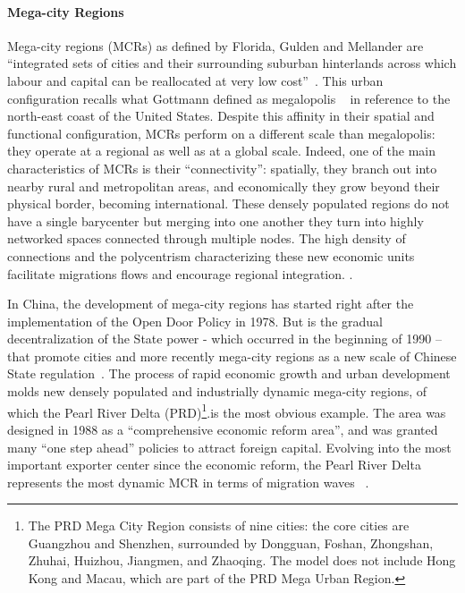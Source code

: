 \paragraph{Mega-city Regions}

Mega-city regions (MCRs) as defined by Florida, Gulden and Mellander are “integrated sets of cities and their surrounding suburban hinterlands across which labour and capital can be reallocated at very low cost”~\cite{florida2008rise}. This urban configuration recalls what Gottmann defined as megalopolis ~\cite{gottman1961megalopolis} in reference to the north-east coast of the United States. Despite this affinity in their spatial and functional configuration, MCRs perform on a different scale than megalopolis: they operate at a regional as well as at a global scale. Indeed, one of the main characteristics of MCRs is their “connectivity”: spatially, they branch out into nearby rural and metropolitan areas, and economically they grow beyond their physical border, becoming international. These densely populated regions do not have a single barycenter but merging into one another they turn into highly networked spaces connected through multiple nodes. The high density of connections and the polycentrism characterizing these new economic units facilitate migrations flows and encourage regional integration. . 

In China, the development of mega-city regions has started right after the implementation of the Open Door Policy in 1978. But is the gradual decentralization of the State power - which occurred in the beginning of  1990 – that promote cities and more recently mega-city regions as a new scale of Chinese State regulation~\cite{IJUR:IJUR12437}. The process of rapid economic growth and urban development molds new densely populated and industrially dynamic mega-city regions, of which the Pearl River Delta (PRD)\footnote{The PRD Mega City Region consists of nine cities: the core cities are Guangzhou and Shenzhen, surrounded by Dongguan, Foshan, Zhongshan, Zhuhai, Huizhou, Jiangmen, and Zhaoqing. The model does not include Hong Kong and Macau, which are part of the PRD Mega Urban Region.}.is the most obvious example. The area was designed in 1988 as a ``comprehensive economic reform area'', and was granted many ``one step ahead'' policies to attract foreign capital. Evolving into the most important exporter center since the economic reform, the Pearl River Delta represents the most dynamic MCR in terms of migration waves ~\cite{IJUR:IJUR820}.

